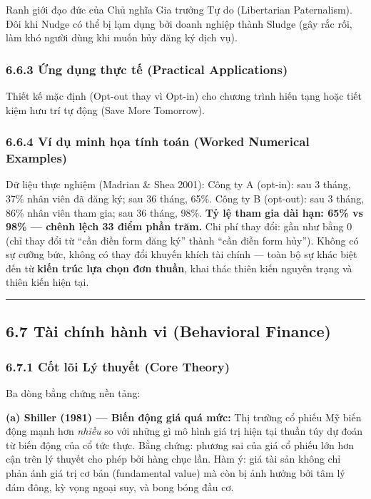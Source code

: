 \documentclass[
]{article}
\begin{document}
Ranh giới đạo đức của Chủ nghĩa Gia trưởng Tự do (Libertarian
Paternalism). Đôi khi Nudge có thể bị lạm dụng bởi doanh nghiệp thành
Sludge (gây rắc rối, làm khó người dùng khi muốn hủy đăng ký dịch vụ).

\subsubsection{6.6.3 Ứng dụng thực tế (Practical
Applications)}\label{ux1ee9ng-dux1ee5ng-thux1ef1c-tux1ebf-practical-applications-14}

Thiết kế mặc định (Opt-out thay vì Opt-in) cho chương trình hiến tạng
hoặc tiết kiệm hưu trí tự động (Save More Tomorrow).

\subsubsection{6.6.4 Ví dụ minh họa tính toán (Worked Numerical
Examples)}\label{vuxed-dux1ee5-minh-hux1ecda-tuxednh-touxe1n-worked-numerical-examples-13}

Dữ liệu thực nghiệm (Madrian \& Shea 2001): Công ty A (opt-in): sau 3
tháng, 37\% nhân viên đã đăng ký; sau 36 tháng, 65\%. Công ty B
(opt-out): sau 3 tháng, 86\% nhân viên tham gia; sau 36 tháng, 98\%.
\textbf{Tỷ lệ tham gia dài hạn: 65\% vs 98\% --- chênh lệch 33 điểm phần
trăm.} Chi phí thay đổi: gần như bằng 0 (chỉ thay đổi từ ``cần điền form
đăng ký'' thành ``cần điền form hủy''). Không có sự cưỡng bức, không có
thay đổi khuyến khích tài chính --- toàn bộ sự khác biệt đến từ
\textbf{kiến trúc lựa chọn đơn thuần}, khai thác thiên kiến nguyên trạng
và thiên kiến hiện tại.

\begin{center}\rule{0.5\linewidth}{0.5pt}\end{center}

\subsection{6.7 Tài chính hành vi (Behavioral
Finance)}\label{tuxe0i-chuxednh-huxe0nh-vi-behavioral-finance}

\subsubsection{6.7.1 Cốt lõi Lý thuyết (Core
Theory)}\label{cux1ed1t-luxf5i-luxfd-thuyux1ebft-core-theory-14}

Ba dòng bằng chứng nền tảng:

\textbf{(a) Shiller (1981) --- Biến động giá quá mức:} Thị trường cổ
phiếu Mỹ biến động mạnh hơn \emph{nhiều} so với những gì mô hình giá trị
hiện tại thuần túy dự đoán từ biến động của cổ tức thực. Bằng chứng:
phương sai của giá cổ phiếu lớn hơn cận trên lý thuyết cho phép bởi hàng
chục lần. Hàm ý: giá tài sản không chỉ phản ánh giá trị cơ bản
(fundamental value) mà còn bị ảnh hưởng bởi tâm lý đám đông, kỳ vọng
ngoại suy, và bong bóng đầu cơ.
\end{document}
